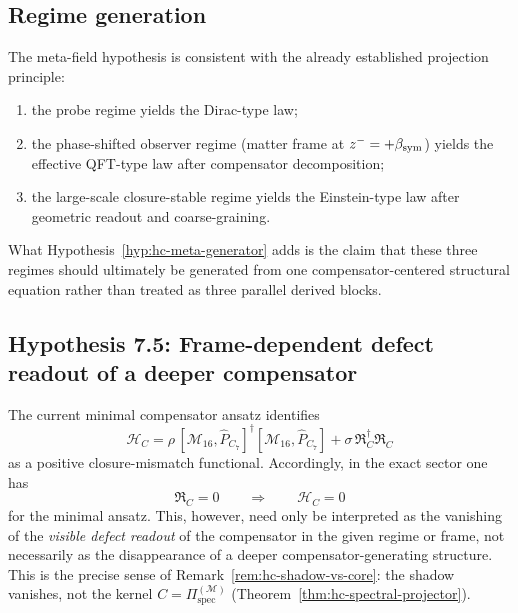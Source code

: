 \subsection*{Regime generation}

The meta-field hypothesis is consistent with the already established
projection principle:
\begin{enumerate}[label=(\arabic*)]
 \item the probe regime yields the Dirac-type law;
 \item the phase-shifted observer regime (matter frame at
 $z^- = +\beta_{\mathrm{sym}}$) yields the effective QFT-type law after
 compensator decomposition;
 \item the large-scale closure-stable regime yields the Einstein-type
 law after geometric readout and coarse-graining.
\end{enumerate}
What Hypothesis~\ref{hyp:hc-meta-generator} adds is the claim that
these three regimes should ultimately be generated from one
compensator-centered structural equation rather than treated as three
parallel derived blocks.


\subsection{Hypothesis 7.5: Frame-dependent defect readout of a deeper compensator}
\label{subsec:hc-frame-dependent-readout}

The current minimal compensator ansatz identifies
\[
 \mathcal{H}_C
 =
 \rho\,[\mathcal{M}_{16},\hat P_{C_7}]^\dagger
 [\mathcal{M}_{16},\hat P_{C_7}]
 +
 \sigma\,\mathfrak{R}_C^\dagger\mathfrak{R}_C
\]
as a positive closure-mismatch functional. Accordingly, in the exact
sector one has
\[
 \mathfrak{R}_C = 0
 \qquad\Longrightarrow\qquad
 \mathcal{H}_C = 0
\]
for the minimal ansatz. This, however, need only be interpreted as the
vanishing of the \emph{visible defect readout} of the compensator in the
given regime or frame, not necessarily as the disappearance of a deeper
compensator-generating structure. This is the precise sense of
Remark~\ref{rem:hc-shadow-vs-core}: the shadow vanishes, not the kernel
$C = \Pi^{(\mathcal{M})}_{\mathrm{spec}}$
(Theorem~\ref{thm:hc-spectral-projector}).

